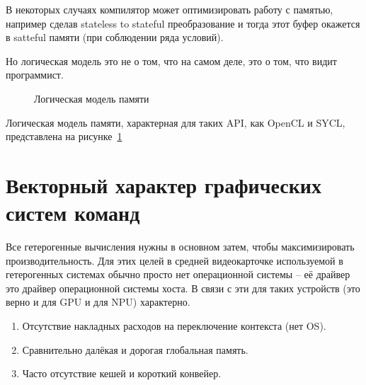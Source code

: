 В некоторых случаях компилятор может оптимизировать работу с памятью, например сделав stateless to stateful преобразование и тогда этот буфер окажется в satteful памяти (при соблюдении ряда условий).

Но логическая модель это не о том, что на самом деле, это о том, что видит программист.

\begin{figure}[ht]
    \caption{Логическая модель памяти}\label{fig:logical-memory}
\end{figure}

Логическая модель памяти, характерная для таких API, как OpenCL и SYCL, представлена на рисунке~\cref{fig:logical-memory}

\section{Векторный характер графических систем команд}\label{sec:overview/hw}

Все гетерогенные вычисления нужны в основном затем, чтобы максимизировать производительность.
Для этих целей в средней видеокарточке используемой в гетерогенных системах обычно просто нет операционной системы -- её драйвер это драйвер операционной системы хоста.
В связи с эти для таких устройств (это верно и для GPU и для NPU) характерно.

\begin{enumerate}
\item Отсутствие накладных расходов на переключение контекста (нет OS).
\item Сравнительно далёкая и дорогая глобальная память.
\item Часто отсутствие кешей и короткий конвейер.
\end{enumerate}


